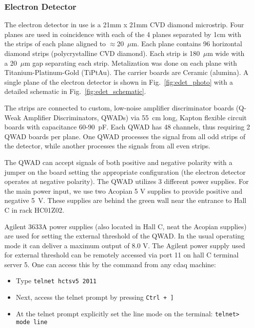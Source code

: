 {\subsubsection{Electron Detector}
The electron detector in use is a 21mm x 21mm CVD diamond microstrip. Four planes are used in coincidence with
each of the 4 planes separated by 1cm with the strips of each plane aligned to $\approx$20~$\mu$m. Each plane contains
96 horizontal diamond strips (polycrystalline CVD diamond). Each strip is 180~$\mu$m wide with a 20~$\mu$m gap
separating each strip. Metalization was done on each plane with Titanium-Platinum-Gold (TiPtAu). The
carrier boards are Ceramic (alumina).  A single plane of the electron detector is shown in
Fig.~\ref{fig:edet_photo} with a detailed schematic in Fig.~\ref{fig:edet_schematic}.

The strips are connected to custom, low-noise amplifier discriminator boards (Q-Weak Amplifier
Discriminators, QWADs) via 55~cm long, Kapton flexible circuit boards with capacitance 60-90~pF. Each QWAD
has 48 channels, thus requiring 2 QWAD boards per plane. One QWAD processes the signal from all odd strips
of the detector, while another processes the signals from all even strips.

The QWAD can accept signals of both positive and negative polarity with a jumper on the board setting the
appropriate configuration (the electron detector operates at negative polarity).  The QWAD utilizes 3
different power supplies. For the main power input, we use two Acopian 5 V supplies to provide positive and
negative 5~V. These supplies are behind the green wall near the entrance to Hall C in rack HC01Z02. 

Agilent 3633A power supplies (also located in Hall C, neat the Acopian supplies) are used for setting the
external threshold of the QWAD. In the usual operating mode it can deliver a maximum output of 8.0 V.
The Agilent power supply used for external threshold can be remotely accessed via port 11 on hall C
terminal server 5. One can access this by the command from any cdaq machine:
\begin{itemize}
\item{Type \texttt{telnet hctsv5 2011}}
\item{Next, access the telnet prompt by pressing \texttt{Ctrl + ]}}
\item{At the telnet prompt explicitly set the line mode on the terminal: \texttt{telnet> mode line}}
\end{itemize}


}
